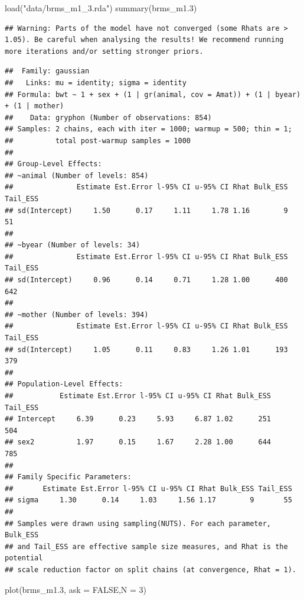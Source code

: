 \documentclass[
  12pt,
]{book}
\newenvironment{Shaded}{\begin{snugshade}}{\end{snugshade}}
\newcommand{\AttributeTok}[1]{\textcolor[rgb]{0.77,0.63,0.00}{#1}}
\newcommand{\ConstantTok}[1]{\textcolor[rgb]{0.00,0.00,0.00}{#1}}
\newcommand{\DecValTok}[1]{\textcolor[rgb]{0.00,0.00,0.81}{#1}}
\newcommand{\FloatTok}[1]{\textcolor[rgb]{0.00,0.00,0.81}{#1}}
\newcommand{\FunctionTok}[1]{\textcolor[rgb]{0.00,0.00,0.00}{#1}}
\newcommand{\NormalTok}[1]{#1}
\newcommand{\StringTok}[1]{\textcolor[rgb]{0.31,0.60,0.02}{#1}}
\begin{document}
\begin{Shaded}
\begin{Highlighting}[]
\FunctionTok{load}\NormalTok{(}\StringTok{"data/brms\_m1\_3.rda"}\NormalTok{)}
\FunctionTok{summary}\NormalTok{(brms\_m1}\FloatTok{.3}\NormalTok{)}
\end{Highlighting}
\end{Shaded}

\begin{verbatim}
## Warning: Parts of the model have not converged (some Rhats are > 1.05). Be careful when analysing the results! We recommend running more iterations and/or setting stronger priors.
\end{verbatim}

\begin{verbatim}
##  Family: gaussian 
##   Links: mu = identity; sigma = identity 
## Formula: bwt ~ 1 + sex + (1 | gr(animal, cov = Amat)) + (1 | byear) + (1 | mother) 
##    Data: gryphon (Number of observations: 854) 
## Samples: 2 chains, each with iter = 1000; warmup = 500; thin = 1;
##          total post-warmup samples = 1000
## 
## Group-Level Effects: 
## ~animal (Number of levels: 854) 
##               Estimate Est.Error l-95% CI u-95% CI Rhat Bulk_ESS Tail_ESS
## sd(Intercept)     1.50      0.17     1.11     1.78 1.16        9       51
## 
## ~byear (Number of levels: 34) 
##               Estimate Est.Error l-95% CI u-95% CI Rhat Bulk_ESS Tail_ESS
## sd(Intercept)     0.96      0.14     0.71     1.28 1.00      400      642
## 
## ~mother (Number of levels: 394) 
##               Estimate Est.Error l-95% CI u-95% CI Rhat Bulk_ESS Tail_ESS
## sd(Intercept)     1.05      0.11     0.83     1.26 1.01      193      379
## 
## Population-Level Effects: 
##           Estimate Est.Error l-95% CI u-95% CI Rhat Bulk_ESS Tail_ESS
## Intercept     6.39      0.23     5.93     6.87 1.02      251      504
## sex2          1.97      0.15     1.67     2.28 1.00      644      785
## 
## Family Specific Parameters: 
##       Estimate Est.Error l-95% CI u-95% CI Rhat Bulk_ESS Tail_ESS
## sigma     1.30      0.14     1.03     1.56 1.17        9       55
## 
## Samples were drawn using sampling(NUTS). For each parameter, Bulk_ESS
## and Tail_ESS are effective sample size measures, and Rhat is the potential
## scale reduction factor on split chains (at convergence, Rhat = 1).
\end{verbatim}

\begin{Shaded}
\begin{Highlighting}[]
\FunctionTok{plot}\NormalTok{(brms\_m1}\FloatTok{.3}\NormalTok{, }\AttributeTok{ask =} \ConstantTok{FALSE}\NormalTok{,}\AttributeTok{N =} \DecValTok{3}\NormalTok{)}
\end{Highlighting}
\end{Shaded}
\end{document}
